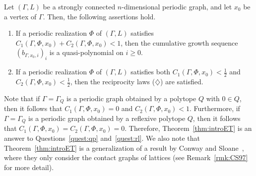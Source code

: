 \documentclass[ALCO,published]{cedram}
\theoremstyle{remark}
\begin{document}
\begin{thm}[{$=$\ Theorem~\ref{thm:ET}}]\label{thm:introET}
Let $(\Gamma, L)$ be a strongly connected $n$-dimensional periodic graph, and let $x_0$ be a vertex of $\Gamma$. Then, the following assertions hold. 
\begin{enumerate}
\item 
If a periodic realization $\Phi$ of $(\Gamma, L)$ satisfies $C_1(\Gamma, \Phi, x_0) + C_2(\Gamma, \Phi, x_0) < 1$, then the cumulative growth sequence $(b_{\Gamma, x_0, i})_i$ is a quasi-polynomial on $i \ge 0$. 

\item 
If a periodic realization $\Phi$ of $(\Gamma, L)$ satisfies both $C_1(\Gamma, \Phi, x_0) < \frac{1}{2}$ and $C_2(\Gamma, \Phi, x_0) < \frac{1}{2}$, then the reciprocity laws ($\diamondsuit$) are satisfied. 
\end{enumerate}
\end{thm}
\noindent
Note that if $\Gamma = \Gamma _Q$ is a periodic graph obtained by a polytope $Q$ with $0 \in Q$, then it follows that $C_1(\Gamma, \Phi, x_0) = 0$ and $C_2(\Gamma, \Phi, x_0) < 1$. 
Furthermore, if $\Gamma = \Gamma _Q$ is a periodic graph obtained by a reflexive polytope $Q$, then it follows that $C_1(\Gamma, \Phi, x_0) = C_2(\Gamma, \Phi, x_0) = 0$.
Therefore, Theorem~\ref{thm:introET} is an answer to Questions~\ref{quest:qp} and~\ref{quest:rl}. 
We also note that Theorem~\ref{thm:introET} is a generalization of a result by Conway and Sloane~\cite{CS97}, where they only consider the contact graphs of lattices (see Remark~\ref{rmk:CS97} for more detail). 

\begin{center}\end{center}
\end{document}
